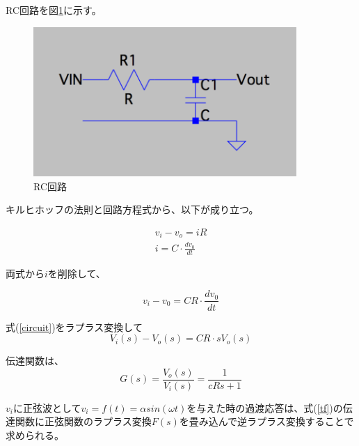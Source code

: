 \documentclass[]{jsarticle}
\begin{document}
RC回路を図\ref{rccircuit}に示す。

\begin{figure}
\centering
\includegraphics[width=100mm]{./image/rccircuit.pdf}
\caption{RC回路}
\label{rccircuit}
\end{figure}

キルヒホッフの法則と回路方程式から、以下が成り立つ。

\begin{eqnarray*}
v_{i} - v_{o} = i R \\
i = C \cdot \frac{d v_{0}}{dt}
\end{eqnarray*}

両式から$i$を削除して、

\begin{equation}
v_{i} - v_{0} = CR \cdot \frac{d v_{0}}{dt} \label{circuit}
\end{equation}

式(\ref{circuit})をラプラス変換して
\begin{equation}
 V_{i}(s) - V_{o}(s) = CR \cdot sV_{o}(s)
\end{equation}

伝達関数は、
\begin{equation}
 G(s) = \frac{V_{o}(s)}{V_{i}(s)} = \frac{1}{cR s+1} \label{tf}
\end{equation}

$v_{i}$に正弦波として$v_{i} = f(t) = \alpha sin (\omega t)$を与えた時の過渡応答は、式(\ref{tf})の伝達関数に正弦関数のラプラス変換$F(s)$を畳み込んで逆ラプラス変換することで求められる。
\end{document}
